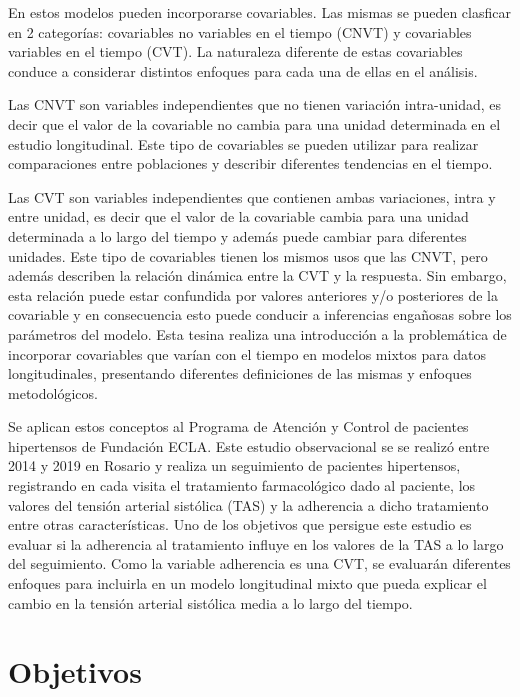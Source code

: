 \documentclass[spanish]{article}
\numberwithin{figure}{subsection}
\numberwithin{equation}{subsection}
\numberwithin{table}{subsection}
\begin{document}
En estos modelos pueden incorporarse covariables. Las mismas se pueden clasficar
en 2 categorías: covariables no variables en el tiempo (CNVT) y covariables
variables en el tiempo (CVT). La naturaleza diferente de estas covariables
conduce a considerar distintos enfoques para cada una de ellas en el análisis.

Las CNVT son variables independientes que no tienen variación intra-unidad, es
decir que el valor de la covariable no cambia para una unidad determinada en
el estudio longitudinal. Este tipo de covariables se pueden utilizar para
realizar comparaciones entre poblaciones y describir diferentes tendencias en el
tiempo.

Las CVT son variables independientes que contienen ambas variaciones, intra y
entre unidad, es decir que el valor de la covariable cambia para una unidad
determinada a lo largo del tiempo y además puede cambiar para diferentes
unidades. Este tipo de covariables tienen los mismos usos que las CNVT, pero
además describen la relación dinámica entre la CVT y la respuesta. Sin embargo,
esta relación puede estar confundida por valores anteriores y/o posteriores de
la covariable y en consecuencia esto puede conducir a inferencias engañosas
sobre los parámetros del modelo. Esta tesina realiza una introducción a la
problemática de incorporar covariables que varían con el tiempo en modelos
mixtos para datos longitudinales, presentando diferentes definiciones de las
mismas y enfoques metodológicos.

Se aplican estos conceptos al Programa de Atención y Control de pacientes
hipertensos de Fundación ECLA. Este estudio observacional se se realizó entre
2014 y 2019 en Rosario y realiza un seguimiento de pacientes hipertensos,
registrando en cada visita el tratamiento farmacológico dado al paciente, los
valores del tensión arterial sistólica (TAS) y la adherencia a dicho tratamiento
entre otras características. Uno de los objetivos que persigue este estudio es
evaluar si la adherencia al tratamiento influye en los valores de la TAS a lo
largo del seguimiento. Como la variable adherencia es una CVT, se evaluarán
diferentes enfoques para incluirla en un modelo longitudinal mixto que pueda
explicar el cambio en la tensión arterial sistólica media a lo largo del tiempo.

\newpage
\section{Objetivos}
\end{document}
